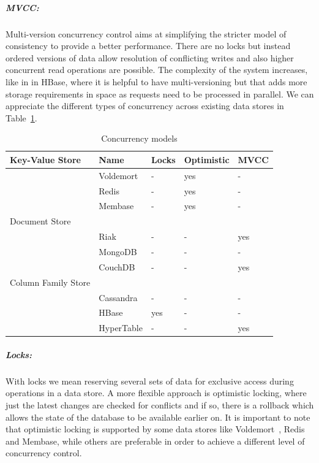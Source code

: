 		\subparagraph{MVCC:}
		Multi-version concurrency control aims at simplifying the stricter model of consistency to provide a better performance. There are no locks but instead ordered versions of data allow resolution of conflicting writes and also higher concurrent read operations are possible. The complexity of the system increases, like in in HBase, where it is helpful to have multi-versioning but that adds more storage requirements in space as requests need to be processed in parallel. We can appreciate the different types of concurrency across existing data stores in Table~\ref{table:concurrency}.
		
		\begin{table}
		\begin{center}
    			\begin{tabular}{ | p{5cm} | l | l | l | l |}
   			\hline
			Key-Value Store & Name & Locks & Optimistic & MVCC \\ \hline   		
			 & Voldemort & - & yes & - \\ \hline
			 & Redis & - & yes & - \\ \hline
			 & Membase & 	- & yes & - \\ \hline
			
			Document Store &  &  &  &  \\ \hline
			 & Riak & - & - & yes \\ \hline			
			 & MongoDB & - & - & - \\ \hline
			 & CouchDB & - & - & yes \\ \hline
			Column Family Store &  &  &  &  \\ \hline
			 & Cassandra & - & - & - \\ \hline
			 & HBase & yes & - & - \\ \hline
			 & HyperTable & - & - & yes \\ \hline
    			\end{tabular}
		\end{center}
		\caption{Concurrency models}
		\label{table:concurrency}
		\end{table}		
	
		\subparagraph{Locks:}
		With locks we mean reserving several sets of data for exclusive access during operations in a data store. A more flexible approach is optimistic locking, where just the latest changes are checked for conflicts and if so, there is a rollback which allows the state of the database to be available earlier on. It is important to note that optimistic locking is supported by some data stores like Voldemort~\cite{Sumbaly:2012}, Redis and Membase, while others are preferable in order to achieve a different level of concurrency control.
		

